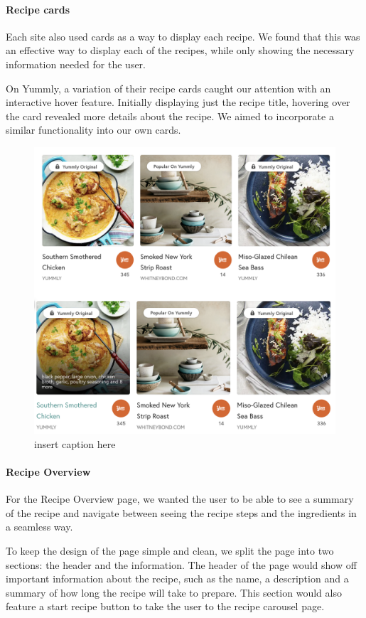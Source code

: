 \documentclass{article}
\begin{document}
\paragraph{Recipe cards}
Each site also used cards as a way to display each recipe. We found that this was an effective way to display each of the recipes, while only showing the necessary information needed for the user.

On Yummly, a variation of their recipe cards caught our attention with an interactive hover feature. Initially displaying just the recipe title, hovering over the card revealed more details about the recipe. We aimed to incorporate a similar functionality into our own cards.

\begin{figure}[htbp]
  \includegraphics[width=1.0\textwidth]{assets/Yummly recipe cards.png}
  \centering
  \caption{insert caption here}
\end{figure}

\paragraph{Recipe Overview}
For the Recipe Overview page, we wanted the user to be able to see a summary of the recipe and navigate between seeing the recipe steps and the ingredients in a seamless way.

To keep the design of the page simple and clean, we split the page into two sections: the header and the information. The header of the page would show off important information about the recipe, such as the name, a description and a summary of how long the recipe will take to prepare. This section would also feature a start recipe button to take the user to the recipe carousel page.
\end{document}
